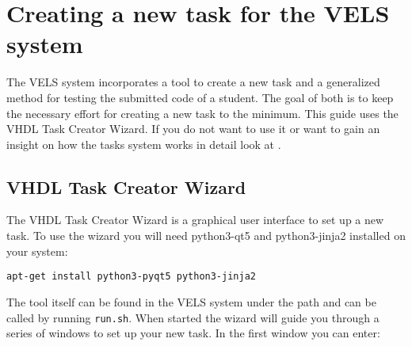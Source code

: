 \section{Creating a new task for the VELS system} \label{create_new_task}

The VELS system incorporates a tool to create a new task and a generalized method for testing the submitted code of a student. The goal of both is to keep the necessary effort for creating a new task to the minimum. This guide uses the VHDL Task Creator Wizard. If you do not want to use it or want to gain an insight on how the tasks system works in detail look at .

\subsection{VHDL Task Creator Wizard} \label{sub:vhdltaskcreator}
The VHDL Task Creator Wizard is a graphical user interface to set up a new task. To use the wizard you will need python3-qt5 and python3-jinja2 installed on your system:
\begin{verbatim}
apt-get install python3-pyqt5 python3-jinja2
\end{verbatim}
The tool itself can be found in the VELS system under the path  and can be called by running \verb|run.sh|.
When started the wizard will guide you through a series of windows to set up your new task. In the first window you can enter:

